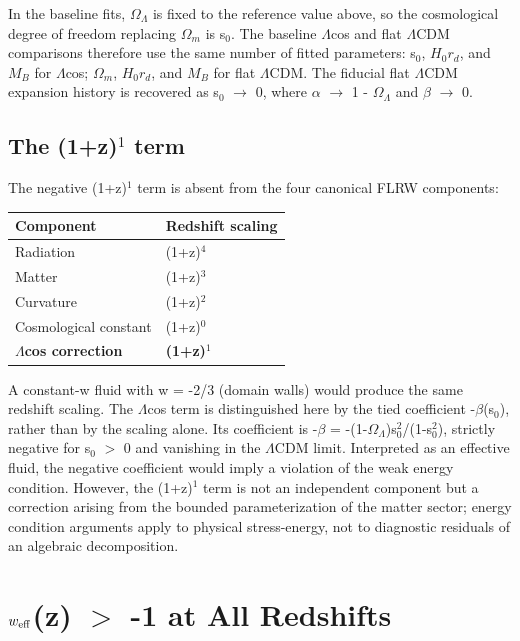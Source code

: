 In the baseline fits, $\Omega_\Lambda$ is fixed to the reference value above, so the
cosmological degree of freedom replacing $\Omega_m$ is s$_0$. The baseline $\Lambda$cos
and flat $\Lambda$CDM comparisons therefore use the same number of fitted
parameters: s$_0$, $H_0 r_d$, and $M_B$ for $\Lambda$cos; $\Omega_m$, $H_0 r_d$, and $M_B$ for
flat $\Lambda$CDM. The fiducial flat $\Lambda$CDM expansion history is recovered as s$_0$ $\to$
0, where $\alpha$ $\to$ 1 - $\Omega_\Lambda$ and $\beta$ $\to$ 0.

\subsection{The (1+z)$^1$ term}\label{sec:1z-term}

The negative (1+z)$^1$ term is absent from the four canonical FLRW
components:

{\def\LTcaptype{none} %
\begin{table}[!htb]
\centering\footnotesize
\begin{tabular}{@{}ll@{}}
\toprule
Component & Redshift scaling \\
\midrule

Radiation & (1+z)$^4$ \\
Matter & (1+z)$^3$ \\
Curvature & (1+z)$^2$ \\
Cosmological constant & (1+z)$^0$ \\
\textbf{$\Lambda$cos correction} & \textbf{(1+z)$^1$} \\
\bottomrule
\end{tabular}
\end{table}
}

A constant-w fluid with w = -2/3 (domain walls) would produce the same
redshift scaling. The $\Lambda$cos term is distinguished here by the tied
coefficient -$\beta$(s$_0$), rather than by the scaling alone. Its coefficient is
-$\beta$ = -(1-$\Omega_\Lambda$)s$_0^2$/(1-s$_0^2$), strictly negative for s$_0$ $>$ 0 and
vanishing in the $\Lambda$CDM limit. Interpreted as an effective fluid, the
negative coefficient would imply a violation of the weak energy
condition. However, the (1+z)$^1$ term is not an independent component but
a correction arising from the bounded parameterization of the matter
sector; energy condition arguments apply to physical stress-energy, not
to diagnostic residuals of an algebraic decomposition.

\section{$w_{\rm eff}$(z) $>$ -1 at All Redshifts}\label{sec:weff-proof}

